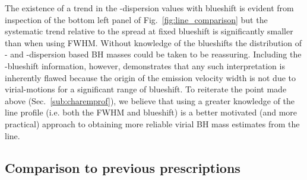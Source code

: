 The existence of a trend in the -dispersion values with  blueshift is evident from inspection of the bottom left panel of Fig.~\ref{fig:line_comparison} but the systematic trend relative to the spread at fixed blueshift is significantly smaller than when using  FWHM. 
Without knowledge of the  blueshifts the distribution of - and \hans-dispersion based BH masses could be taken to be reassuring. 
Including the -blueshift information, however, demonstrates that any such interpretation is inherently flawed because the origin of the  emission velocity width is not due to virial-motions for a significant range of  blueshift. 
To reiterate the point made above (Sec.~\ref{sub:charemprof}), we believe that using a greater knowledge of the line profile (i.e. both the FWHM and blueshift) is a better motivated (and more practical) approach to obtaining more reliable virial BH mass estimates from the  line. 

\subsection{Comparison to previous prescriptions}

